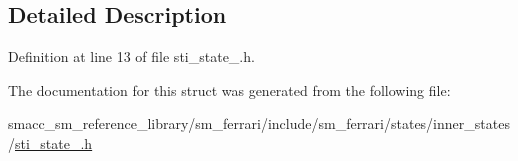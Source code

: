 \subsection{Detailed Description}


Definition at line 13 of file sti\+\_\+state\+\_.\+h.



The documentation for this struct was generated from the following file\+:\begin{DoxyCompactItemize}
\item 
smacc\+\_\+sm\+\_\+reference\+\_\+library/sm\+\_\+ferrari/include/sm\+\_\+ferrari/states/inner\+\_\+states/\hyperlink{sm__ferrari_2include_2sm__ferrari_2states_2inner__states_2sti__state__3_8h}{sti\+\_\+state\+\_.\+h}\end{DoxyCompactItemize}
